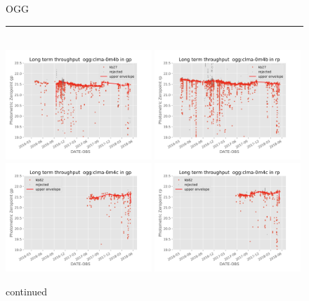 \documentclass[draft]{spieman}
\begin{document}
\begin{figure}
OGG  \\ 
\rule{\textwidth}{0.4pt} \\
\includegraphics[width=0.49\textwidth]{images/photzptrend-ogg-clma-0m4b-gp.png} \hspace*{\fill}
\includegraphics[width=0.49\textwidth]{images/photzptrend-ogg-clma-0m4b-rp.png} \\
\includegraphics[width=0.49\textwidth]{images/photzptrend-ogg-clma-0m4c-gp.png} \hspace*{\fill}
\includegraphics[width=0.49\textwidth]{images/photzptrend-ogg-clma-0m4c-rp.png} \\[1ex]
\caption {continued}
\end{figure}
\end{document}
